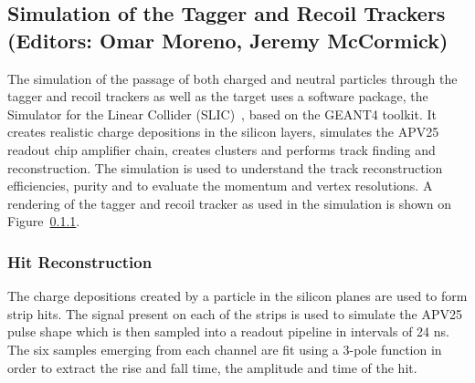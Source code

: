 
\subsection{Simulation of the Tagger and Recoil Trackers (Editors: Omar Moreno, Jeremy McCormick)}

The simulation of the passage of both charged and neutral particles through 
the tagger and recoil trackers as well as the target uses a software 
package, the Simulator for the Linear Collider (SLIC)~\cite{}, based on the
GEANT4 toolkit. It creates realistic charge depositions in the silicon layers,
simulates the APV25 readout chip amplifier chain, creates clusters and performs
track finding and reconstruction.
The simulation is used to understand the track reconstruction efficiencies,
purity and to evaluate the momentum and vertex resolutions. A rendering of
the tagger and recoil tracker as used in the simulation is shown on 
Figure~\ref{}.
\begin{figure}
\end{figure}


\subsubsection{Hit Reconstruction}

The charge depositions created by a particle in the silicon planes are used to
form strip hits. The signal present on each of the strips is used to simulate 
the APV25 pulse shape which is then sampled into a readout pipeline in intervals
of 24 ns. The six samples emerging from each channel are fit using a 3-pole 
function in order to extract the rise and fall time, the amplitude and time of 
the hit.

